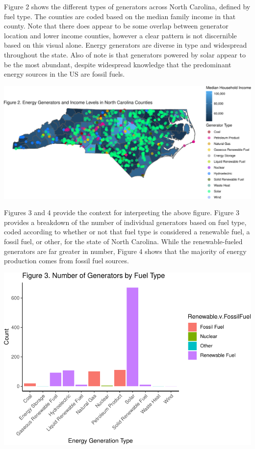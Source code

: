 \documentclass[
  12pt,
]{article}
\begin{document}
Figure 2 shows the different types of generators across North Carolina,
defined by fuel type. The counties are coded based on the median family
income in that county. Note that there does appear to be some overlap
between generator location and lower income counties, however a clear
pattern is not discernible based on this visual alone. Energy generators
are diverse in type and widespread throughout the state. Also of note is
that generators powered by solar appear to be the most abundant, despite
widespread knowledge that the predominant energy sources in the US are
fossil fuels.

\includegraphics{Project_files/figure-latex/unnamed-chunk-2-1.pdf}

Figures 3 and 4 provide the context for interpreting the above figure.
Figure 3 provides a breakdown of the number of individual generators
based on fuel type, coded according to whether or not that fuel type is
considered a renewable fuel, a fossil fuel, or other, for the state of
North Carolina. While the renewable-fueled generators are far greater in
number, Figure 4 shows that the majority of energy production comes from
fossil fuel sources.

\includegraphics{Project_files/figure-latex/unnamed-chunk-3-1.pdf}
\end{document}
